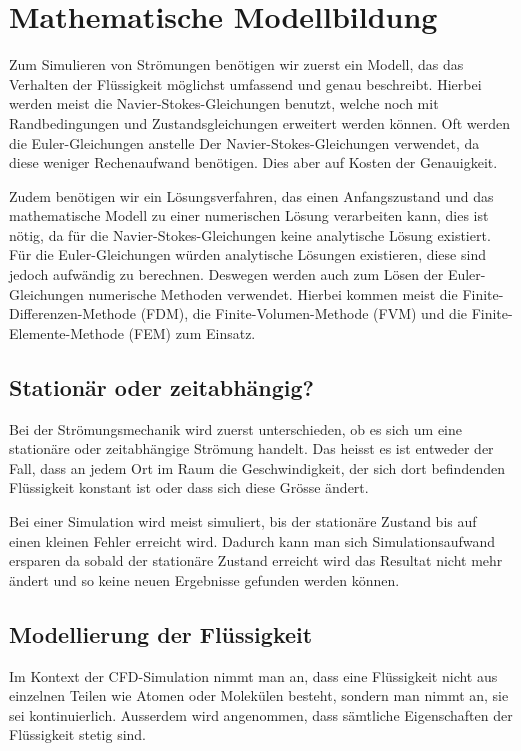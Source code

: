%
%
%
%
\section{Mathematische Modellbildung
\label{openfoam:section:teil1}}
Zum Simulieren von Strömungen benötigen wir zuerst ein Modell, das das Verhalten der Flüssigkeit möglichst umfassend und genau beschreibt. 
Hierbei werden meist die Navier-Stokes-Gleichungen benutzt, welche noch mit Randbedingungen und Zustandsgleichungen erweitert werden können. 
Oft werden die Euler-Gleichungen anstelle Der Navier-Stokes-Gleichungen verwendet, da diese weniger Rechenaufwand benötigen.
Dies aber auf Kosten der Genauigkeit.

Zudem benötigen wir ein Lösungsverfahren, das einen Anfangszustand und das mathematische Modell zu einer numerischen Lösung verarbeiten kann, dies ist nötig, da für die Navier-Stokes-Gleichungen keine analytische Lösung existiert.
Für die Euler-Gleichungen würden analytische Lösungen existieren, diese sind jedoch aufwändig zu berechnen.
Deswegen werden auch zum Lösen der Euler-Gleichungen numerische Methoden verwendet.
Hierbei kommen meist die Finite-Differenzen-Methode (FDM), die Finite-Volumen-Methode (FVM) und die Finite-Elemente-Methode (FEM) zum Einsatz. 

\subsection{Stationär oder zeitabhängig?}
Bei der Strömungsmechanik wird zuerst unterschieden, ob es sich um eine stationäre oder zeitabhängige Strömung handelt.
Das heisst es ist entweder der Fall, dass an jedem Ort im Raum die Geschwindigkeit, der sich dort befindenden Flüssigkeit  konstant ist oder dass sich diese Grösse ändert.

Bei einer Simulation wird meist simuliert, bis der stationäre Zustand bis auf einen kleinen Fehler erreicht wird.
Dadurch kann man sich Simulationsaufwand ersparen da sobald der stationäre Zustand erreicht wird das Resultat nicht mehr ändert und so keine neuen Ergebnisse gefunden werden können.

\subsection{Modellierung der Flüssigkeit}
Im Kontext der CFD-Simulation nimmt man an, dass eine Flüssigkeit nicht aus einzelnen Teilen wie Atomen oder Molekülen besteht, sondern man nimmt an, sie sei kontinuierlich. 
Ausserdem wird angenommen, dass sämtliche Eigenschaften der Flüssigkeit stetig sind. 


